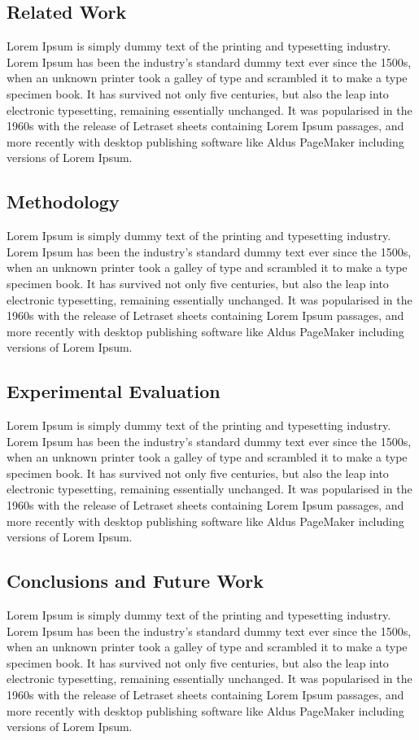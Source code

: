 \subsection{Related Work}
Lorem Ipsum is simply dummy text of the printing and typesetting industry. Lorem Ipsum has been the industry's standard dummy text ever since the 1500s, when an unknown printer took a galley of type and scrambled it to make a type specimen book. It has survived not only five centuries, but also the leap into electronic typesetting, remaining essentially unchanged. It was popularised in the 1960s with the release of Letraset sheets containing Lorem Ipsum passages, and more recently with desktop publishing software like Aldus PageMaker including versions of Lorem Ipsum.


\subsection{Methodology}
Lorem Ipsum is simply dummy text of the printing and typesetting industry. Lorem Ipsum has been the industry's standard dummy text ever since the 1500s, when an unknown printer took a galley of type and scrambled it to make a type specimen book. It has survived not only five centuries, but also the leap into electronic typesetting, remaining essentially unchanged. It was popularised in the 1960s with the release of Letraset sheets containing Lorem Ipsum passages, and more recently with desktop publishing software like Aldus PageMaker including versions of Lorem Ipsum.


\subsection{Experimental Evaluation}
Lorem Ipsum is simply dummy text of the printing and typesetting industry. Lorem Ipsum has been the industry's standard dummy text ever since the 1500s, when an unknown printer took a galley of type and scrambled it to make a type specimen book. It has survived not only five centuries, but also the leap into electronic typesetting, remaining essentially unchanged. It was popularised in the 1960s with the release of Letraset sheets containing Lorem Ipsum passages, and more recently with desktop publishing software like Aldus PageMaker including versions of Lorem Ipsum.


\subsection{Conclusions and Future Work}
Lorem Ipsum is simply dummy text of the printing and typesetting industry. Lorem Ipsum has been the industry's standard dummy text ever since the 1500s, when an unknown printer took a galley of type and scrambled it to make a type specimen book. It has survived not only five centuries, but also the leap into electronic typesetting, remaining essentially unchanged. It was popularised in the 1960s with the release of Letraset sheets containing Lorem Ipsum passages, and more recently with desktop publishing software like Aldus PageMaker including versions of Lorem Ipsum.


